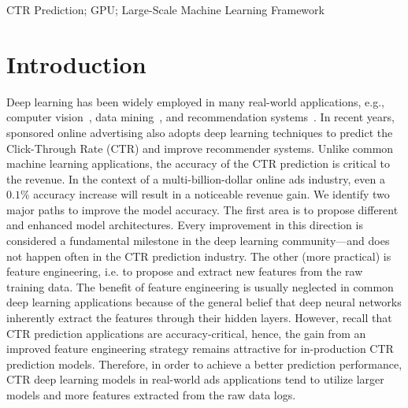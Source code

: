 \documentclass[conference]{IEEEtran}
\begin{document}
\begin{IEEEkeywords}
CTR Prediction; GPU; Large-Scale Machine Learning Framework
\end{IEEEkeywords}



\section{Introduction}\label{sec:intro}

Deep learning has been widely employed in many real-world applications, e.g., computer vision~\cite{Proc:GAN_NIPS14,Proc:Resnet_CVPR16,CV_review18}, data mining~\cite{nguyen2019machine}, and recommendation systems~\cite{Proc:Covington_2016,Article:Wei_2017,cheng2016wide,zhang2019deep}.  In recent years, sponsored online advertising also adopts deep learning techniques to predict the Click-Through Rate (CTR) and improve recommender systems. Unlike common machine learning applications, the accuracy of the CTR prediction is critical to the revenue. 
In the context of a multi-billion-dollar online ads industry, even a $0.1\%$ accuracy increase will result in a noticeable revenue gain. 
We identify two major paths to improve the model accuracy. The first area is to propose different and enhanced model architectures. Every improvement in this direction is considered a fundamental milestone in the deep learning community---and does not happen often in the CTR prediction industry.
The other (more practical) is feature engineering, i.e. to propose and extract new features from the raw training data. The benefit of feature engineering is usually neglected in common deep learning applications because of the general belief that deep neural networks inherently extract the features through their hidden layers. However, recall that CTR prediction applications are accuracy-critical, hence, the gain from an improved feature engineering strategy remains attractive for in-production CTR prediction models. 
Therefore, in order to achieve a better prediction performance, CTR deep learning models in real-world ads applications tend to utilize larger models and more features extracted from the raw data logs. 
\end{document}
